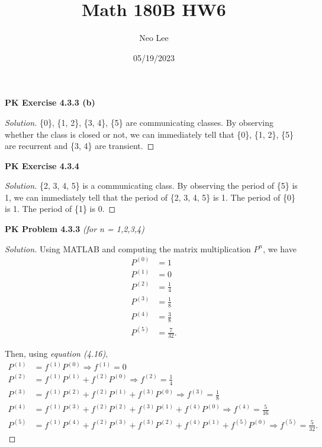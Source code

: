 \documentclass{article}
\title{Math 180B HW6}
\author{Neo Lee}
\date{05/19/2023}
\begin{document}
 

\maketitle 

\textbf{PK Exercise 4.3.3 (b)}
\begin{proof}[Solution]
    \{0\}, \{1, 2\}, \{3, 4\}, \{5\} are communicating classes. By observing whether the class is closed or not, we can immediately tell that \{0\}, \{1, 2\}, \{5\} are recurrent and \{3, 4\} are transient.
\end{proof}
\bigbreak


\textbf{PK Exercise 4.3.4}
\begin{proof}[Solution]
    \{2, 3, 4, 5\} is a communicating class. By observing the period of \{5\} is 1, we can immediately tell that the period of \{2, 3, 4, 5\} is 1. The period of \{0\} is 1. The period of \{1\} is 0.
\end{proof}
\bigbreak


\textbf{PK Problem 4.3.3} \emph{(for n = 1,2,3,4)}
\begin{proof}[Solution]
    Using MATLAB and computing the matrix multiplication $P^n$, we have
    \begin{align*}
        P^{(0)} & = 1 \\
        P^{(1)} & = 0 \\
        P^{(2)} & = \frac{1}{4} \\
        P^{(3)} & = \frac{1}{8} \\
        P^{(4)} & = \frac{3}{8} \\
        P^{(5)} & = \frac{7}{32}.
    \end{align*}

    Then, using \emph{equation (4.16)}, 
    \begin{align*}
        P^{(1)} & = f^{(1)}P^{(0)} \Rightarrow f^{(1)} = 0 \\
        P^{(2)} & = f^{(1)}P^{(1)} + f^{(2)}P^{(0)} \Rightarrow f^{(2)} = \frac{1}{4} \\
        P^{(3)} & = f^{(1)}P^{(2)} + f^{(2)}P^{(1)} + f^{(3)}P^{(0)} \Rightarrow f^{(3)} = \frac{1}{8} \\
        P^{(4)} & = f^{(1)}P^{(3)} + f^{(2)}P^{(2)} + f^{(3)}P^{(1)} + f^{(4)}P^{(0)} \Rightarrow f^{(4)} = \frac{5}{16} \\
        P^{(5)} & = f^{(1)}P^{(4)} + f^{(2)}P^{(3)} + f^{(3)}P^{(2)} + f^{(4)}P^{(1)} + f^{(5)}P^{(0)} \Rightarrow f^{(5)} = \frac{5}{32}.
    \end{align*}
\end{proof}
\bigbreak
\end{document}
